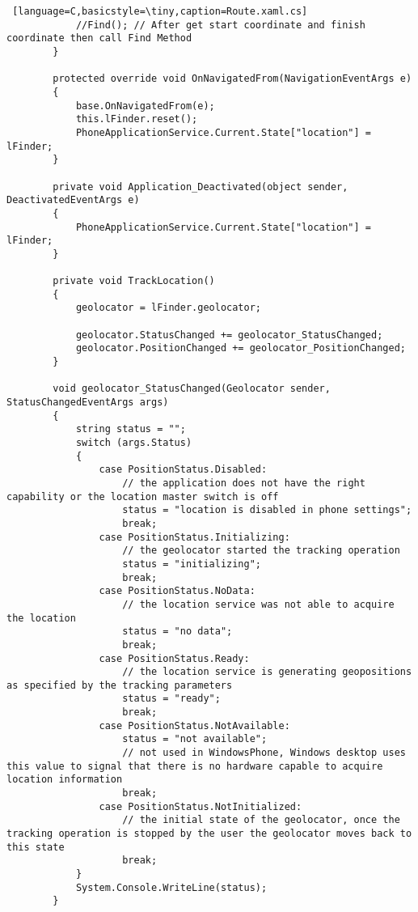 \begin{lstlisting} [language=C,basicstyle=\tiny,caption=Route.xaml.cs]
            //Find(); // After get start coordinate and finish coordinate then call Find Method
        }

        protected override void OnNavigatedFrom(NavigationEventArgs e)
        {
            base.OnNavigatedFrom(e);
            this.lFinder.reset();
            PhoneApplicationService.Current.State["location"] = lFinder;
        }

        private void Application_Deactivated(object sender, DeactivatedEventArgs e)
        {
            PhoneApplicationService.Current.State["location"] = lFinder;
        }

        private void TrackLocation()
        {
            geolocator = lFinder.geolocator;

            geolocator.StatusChanged += geolocator_StatusChanged;
            geolocator.PositionChanged += geolocator_PositionChanged;
        }

        void geolocator_StatusChanged(Geolocator sender, StatusChangedEventArgs args)
        {
            string status = "";
            switch (args.Status)
            {
                case PositionStatus.Disabled:
                    // the application does not have the right capability or the location master switch is off
                    status = "location is disabled in phone settings";
                    break;
                case PositionStatus.Initializing:
                    // the geolocator started the tracking operation
                    status = "initializing";
                    break;
                case PositionStatus.NoData:
                    // the location service was not able to acquire the location
                    status = "no data";
                    break;
                case PositionStatus.Ready:
                    // the location service is generating geopositions as specified by the tracking parameters
                    status = "ready";
                    break;
                case PositionStatus.NotAvailable:
                    status = "not available";
                    // not used in WindowsPhone, Windows desktop uses this value to signal that there is no hardware capable to acquire location information
                    break;
                case PositionStatus.NotInitialized:
                    // the initial state of the geolocator, once the tracking operation is stopped by the user the geolocator moves back to this state
                    break;
            }
            System.Console.WriteLine(status);
        }


\end{lstlisting}
